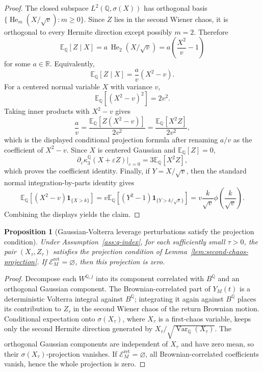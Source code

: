 \documentclass[11pt,a4paper]{amsart}
\theoremstyle{plain}
\newtheorem{proposition}[theorem]{Proposition}
\theoremstyle{definition}
\theoremstyle{remark}
\DeclareMathOperator{\Var}{Var}
\DeclareMathOperator{\He}{He}
\newcommand{\R}{\mathbb{R}}
\newcommand{\QQ}{\mathbb{Q}}
\newcommand{\EE}{\mathbb{E}}
\newcommand{\cE}{\mathcal{E}}
\newcommand{\one}{\mathbf{1}}
\begin{document}
\begin{proof}
The closed subspace \(L^2(\QQ,\sigma(X))\) has orthogonal basis
\(\{\He_m(X/\sqrt v):m\ge0\}\).  Since \(Z\) lies in the second Wiener chaos, it is orthogonal to
every Hermite direction except possibly \(m=2\).  Therefore
\[
        \EE_\QQ[Z\mid X]
        =
        a\,\He_2(X/\sqrt v)
        =
        a\left(\frac{X^2}{v}-1\right)
\]
for some \(a\in\R\).  Equivalently,
\[
        \EE_\QQ[Z\mid X]=\frac{a}{v}(X^2-v).
\]
For a centered normal variable \(X\) with variance \(v\),
\[
        \EE_\QQ[(X^2-v)^2]=2v^2.
\]
Taking inner products with \(X^2-v\) gives
\[
        \frac{a}{v}
        =
        \frac{\EE_\QQ[Z(X^2-v)]}{2v^2}
        =
        \frac{\EE_\QQ[X^2Z]}{2v^2},
\]
which is the displayed conditional projection formula after renaming \(a/v\) as the coefficient
of \(X^2-v\).
Since \(X\) is centered Gaussian and \(\EE_\QQ[Z]=0\),
\[
        \partial_\varepsilon\kappa_3^\QQ(X+\varepsilon Z)|_{\varepsilon=0}=3\EE_\QQ[X^2Z],
\]
which proves the coefficient identity.  Finally, if \(Y=X/\sqrt v\), then the standard normal
integration-by-parts identity gives
\[
        \EE_\QQ[(X^2-v)\one_{\{X>k\}}]
        =
        v\EE_\QQ\!\left[(Y^2-1)\one_{\{Y>k/\sqrt v\}}\right]
        =
        v\frac{k}{\sqrt v}\phi\!\left(\frac{k}{\sqrt v}\right).
\]
Combining the displays yields the claim.
\end{proof}

\begin{proposition}[Gaussian-Volterra leverage perturbations satisfy the projection condition]\label{prop:gaussian-volterra-projection-condition}
Under Assumption~\ref{ass:q-index}, for each sufficiently small \(\tau>0\), the pair
\((X_\tau,Z_\tau)\) satisfies the projection condition of
Lemma~\ref{lem:second-chaos-projection}.  If \(\cE_M^{\mathrm{ret}}=\varnothing\), then this
projection is zero.
\end{proposition}

\begin{proof}
Decompose each \(W^{\QQ,j}\) into its component correlated with \(B^\QQ\) and an orthogonal
Gaussian component.  The Brownian-correlated part of \(Y_M(t)\) is a deterministic Volterra
integral against \(B^\QQ\); integrating it again against \(B^\QQ\) places its contribution to
\(Z_\tau\) in the second Wiener chaos of the return Brownian motion.  Conditional expectation onto
\(\sigma(X_\tau)\), where \(X_\tau\) is a first-chaos variable, keeps only the second Hermite
direction generated by \(X_\tau/\sqrt{\Var_\QQ(X_\tau)}\).  The orthogonal Gaussian components are
independent of \(X_\tau\) and have zero mean, so their \(\sigma(X_\tau)\)-projection vanishes.  If
\(\cE_M^{\mathrm{ret}}=\varnothing\), all Brownian-correlated coefficients vanish, hence the whole
projection is zero.
\end{proof}
\end{document}
